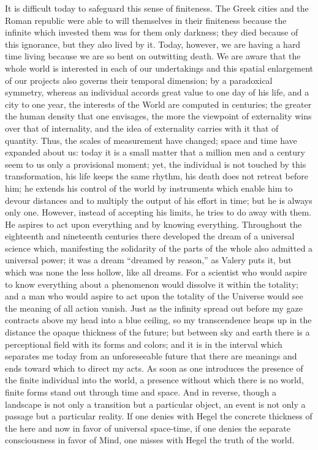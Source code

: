 \documentclass[11pt]{article}
\begin{document}
{{It is difficult today to safeguard this sense of finiteness. The Greek cities and the Roman republic were able to will themselves in their finiteness because the infinite which invested them was for them only darkness; they died because of this ignorance, but they also lived by it. Today, however, we are having a hard time living because we are so bent on outwitting death. We are aware that the whole world is interested in each of our undertakings and this spatial enlargement of our projects also governs their temporal dimension; by a paradoxical symmetry, whereas an individual accords great value to one day of his life, and a city to one year, the interests of the World are computed in centuries; the greater the human density that one envisages, the more the viewpoint of externality wins over that of internality, and the idea of externality carries with it that of quantity. Thus, the scales of measurement have changed; space and time have expanded about us: today it is a small matter that a million men and a century seem to us only a provisional moment; yet, the individual is not touched by this transformation, his life keeps the same rhythm, his death does not retreat before him; he extends his control of the world by instruments which enable him to devour distances and to multiply the output of his effort in time; but he is always only one. However, instead of accepting his limits, he tries to do away with them. He aspires to act upon everything and by knowing everything. Throughout the eighteenth and nineteenth centuries there developed the dream of a universal science which, manifesting the solidarity of the parts of the whole also admitted a universal power; it was a dream “dreamed by reason,” as Valery puts it, but which was none the less hollow, like all dreams. For a scientist who would aspire to know everything about a phenomenon would dissolve it within the totality; and a man who would aspire to act upon the totality of the Universe would see the meaning of all action vanish. Just as the infinity spread out before my gaze contracts above my head into a blue ceiling, so my transcendence heaps up in the distance the opaque thickness of the future; but between sky and earth there is a perceptional field with its forms and colors; and it is in the interval which separates me today from an unforeseeable future that there are meanings and ends toward which to direct my acts. As soon as one introduces the presence of the finite individual into the world, a presence without which there is no world, finite forms stand out through time and space. And in reverse, though a landscape is not only a transition but a particular object, an event is not only a passage but a particular reality. If one denies with Hegel the concrete thickness of the here and now in favor of universal space-time, if one denies the separate consciousness in favor of Mind, one misses with Hegel the truth of the world.

}}
\end{document}
